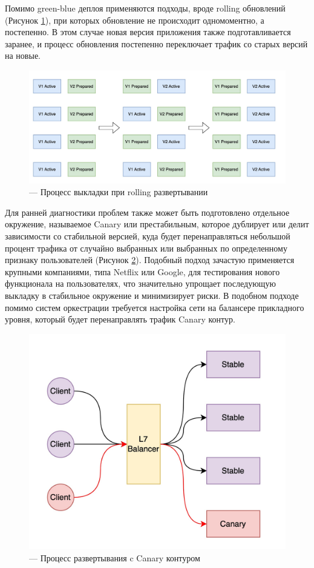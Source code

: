 Помимо green-blue деплоя применяются подходы, вроде rolling обновлений (Рисунок \ref{fig:rolling}), при которых обновление не происходит
одномоментно, а постепенно. В этом случае новая версия приложения также подготавливается заранее, и процесс обновления
постепенно переключает трафик со старых версий на новые.

\begin{figure}[H]
    \centering
    \includegraphics[width=0.8\linewidth]{img/rolling.jpg}
    \caption{--- Процесс выкладки при rolling развертывании}
    \label{fig:rolling}
\end{figure}

Для ранней диагностики проблем также может быть подготовлено отдельное окружение, называемое Canary или престабильным, которое дублирует или делит 
зависимости со стабильной версией, куда будет перенаправляться небольшой процент трафика от случайно выбранных или выбранных
по определенному признаку пользователей (Рисунок \ref{fig:canary}). Подобный подход зачастую применяется крупными компаниями, типа Netflix или Google, для
тестирования нового функционала на пользователях, что значительно упрощает последующую выкладку в стабильное окружение
и минимизирует риски. В подобном подходе помимо систем оркестрации требуется настройка 
сети на балансере прикладного уровня, который будет перенаправлять трафик Canary контур. 

\begin{figure}[H]
    \centering
    \includegraphics[width=0.8\linewidth]{img/canary.jpg}
    \caption{---  Процесс развертывания c Canary контуром}
    \label{fig:canary}
\end{figure}

